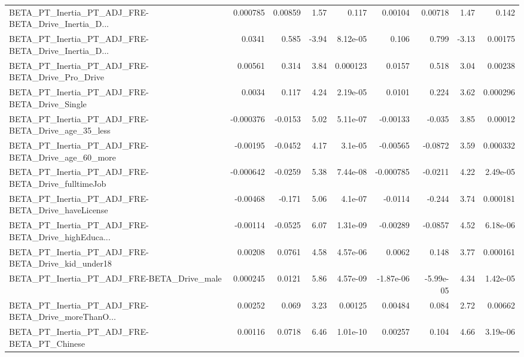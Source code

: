 \begin{tabular}{lrrrrrrrr}
BETA\_PT\_Inertia\_PT\_ADJ\_FRE-BETA\_Drive\_Inertia\_D... &    0.000785 &      0.00859 &     1.57 &    0.117 &    0.00104 &     0.00718 &         1.47 &         0.142 \\
BETA\_PT\_Inertia\_PT\_ADJ\_FRE-BETA\_Drive\_Inertia\_D... &      0.0341 &        0.585 &    -3.94 & 8.12e-05 &      0.106 &       0.799 &        -3.13 &       0.00175 \\
BETA\_PT\_Inertia\_PT\_ADJ\_FRE-BETA\_Drive\_Pro\_Drive    &     0.00561 &        0.314 &     3.84 & 0.000123 &     0.0157 &       0.518 &         3.04 &       0.00238 \\
BETA\_PT\_Inertia\_PT\_ADJ\_FRE-BETA\_Drive\_Single       &      0.0034 &        0.117 &     4.24 & 2.19e-05 &     0.0101 &       0.224 &         3.62 &      0.000296 \\
BETA\_PT\_Inertia\_PT\_ADJ\_FRE-BETA\_Drive\_age\_35\_less  &   -0.000376 &      -0.0153 &     5.02 & 5.11e-07 &   -0.00133 &      -0.035 &         3.85 &       0.00012 \\
BETA\_PT\_Inertia\_PT\_ADJ\_FRE-BETA\_Drive\_age\_60\_more  &    -0.00195 &      -0.0452 &     4.17 &  3.1e-05 &   -0.00565 &     -0.0872 &         3.59 &      0.000332 \\
BETA\_PT\_Inertia\_PT\_ADJ\_FRE-BETA\_Drive\_fulltimeJob  &   -0.000642 &      -0.0259 &     5.38 & 7.44e-08 &  -0.000785 &     -0.0211 &         4.22 &      2.49e-05 \\
BETA\_PT\_Inertia\_PT\_ADJ\_FRE-BETA\_Drive\_haveLicense  &    -0.00468 &       -0.171 &     5.06 &  4.1e-07 &    -0.0114 &      -0.244 &         3.74 &      0.000181 \\
BETA\_PT\_Inertia\_PT\_ADJ\_FRE-BETA\_Drive\_highEduca... &    -0.00114 &      -0.0525 &     6.07 & 1.31e-09 &   -0.00289 &     -0.0857 &         4.52 &      6.18e-06 \\
BETA\_PT\_Inertia\_PT\_ADJ\_FRE-BETA\_Drive\_kid\_under18  &     0.00208 &       0.0761 &     4.58 & 4.57e-06 &     0.0062 &       0.148 &         3.77 &      0.000161 \\
BETA\_PT\_Inertia\_PT\_ADJ\_FRE-BETA\_Drive\_male         &    0.000245 &       0.0121 &     5.86 & 4.57e-09 &  -1.87e-06 &   -5.99e-05 &         4.34 &      1.42e-05 \\
BETA\_PT\_Inertia\_PT\_ADJ\_FRE-BETA\_Drive\_moreThanO... &     0.00252 &        0.069 &     3.23 &  0.00125 &    0.00484 &       0.084 &         2.72 &       0.00662 \\
BETA\_PT\_Inertia\_PT\_ADJ\_FRE-BETA\_PT\_Chinese         &     0.00116 &       0.0718 &     6.46 & 1.01e-10 &    0.00257 &       0.104 &         4.66 &      3.19e-06 \\

\end{tabular}
